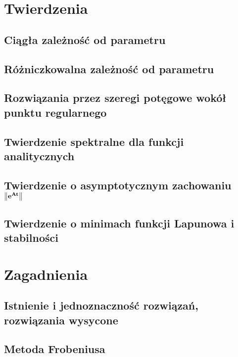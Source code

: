 



  \maketitle
  
  \tableofcontents
  
  \chapter{Twierdzenia}
    \section{Ciągła zależność od parametru}
      
    \section{Różniczkowalna zależność od parametru}
      
    \section{Rozwiązania przez szeregi potęgowe wokół punktu regularnego}
      
    \section{Twierdzenie spektralne dla funkcji analitycznych}
      
    \section{Twierdzenie o asymptotycznym zachowaniu $\mathbf{ \norm*{e^{At}} }$}
    \section{Twierdzenie o minimach funkcji Lapunowa i stabilności}
    
  \chapter{Zagadnienia}
    \section{Istnienie i jednoznaczność rozwiązań, rozwiązania wysycone}
      
    \section{Metoda Frobeniusa}

